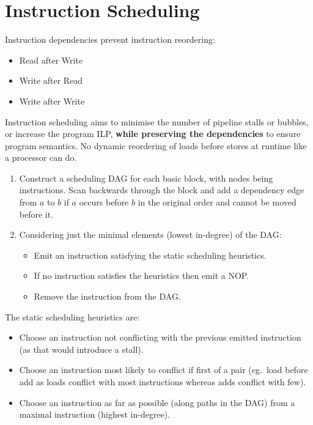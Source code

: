 \documentclass[a4paper, 11pt]{article}
\begin{document}
\section*{Instruction Scheduling}
{
    Instruction dependencies prevent instruction reordering:
    \begin{itemize}
    \item Read after Write
    \item Write after Read
    \item Write after Write
    \end{itemize}

    Instruction scheduling aims to minimise the number of pipeline stalls or bubbles, or increase the program ILP, \textbf{while preserving the dependencies} to ensure program semantics. No dynamic reordering of loads before stores at runtime like a processor can do.

    \begin{enumerate}
    \item Construct a scheduling DAG for each basic block, with nodes being instructions. Scan backwards through the block and add a dependency edge from \(a\) to \(b\) if \(a\) occurs before \(b\) in the original order and cannot be moved before it.
    \item
    {
        Considering just the minimal elements (lowest in-degree) of the DAG:
        \begin{itemize}
        \item Emit an instruction satisfying the static scheduling heuristics.
        \item If no instruction satisfies the heuristics then emit a NOP.
        \item Remove the instruction from the DAG.
        \end{itemize}
    }
    \end{enumerate}

    The static scheduling heuristics are:
    \begin{itemize}
    \item Choose an instruction not conflicting with the previous emitted instruction (as that would introduce a stall).
    \item Choose an instruction most likely to conflict if first of a pair (eg.\ load before add as loads conflict with most instructions whereas adds conflict with few).
    \item Choose an instruction as far as possible (along paths in the DAG) from a maximal instruction (highest in-degree).
    \end{itemize}

}
\end{document}
